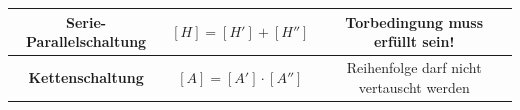 \begin{tabular}{| c | c | c |}
			\\
			\hline
			\textbf{Serie-Parallelschaltung}
				& $ [H]=[H']+[H'']$
				& Torbedingung muss erfüllt sein!
					\\
			\hline
				\textbf{Kettenschaltung}
				& $ [A]=[A']\cdot[A'']$
				& Reihenfolge darf nicht vertauscht werden
					\\
			\hline
		\end{tabular}
	\renewcommand{\arraystretch}{\arraystretchOriginal}
	
	
	

